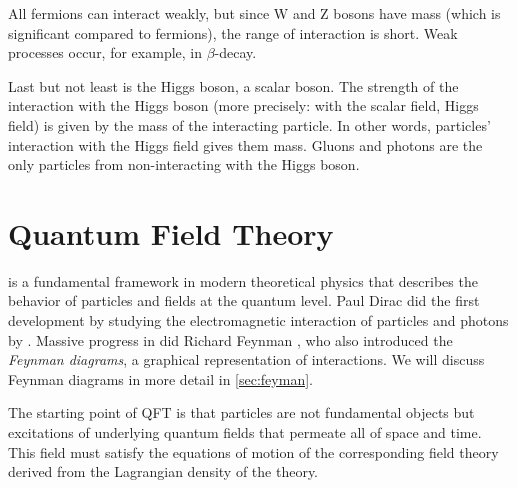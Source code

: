 All fermions can interact weakly, but since W and Z bosons have mass (which is significant compared to fermions), the range of interaction is short.
Weak processes occur, for example, in $\beta$-decay.

Last but not least is the Higgs boson, a scalar boson.
The strength of the interaction with the Higgs boson (more precisely: with the scalar field, Higgs field) is given by the mass of the interacting particle.
In other words, particles' interaction with the Higgs field gives them mass.
Gluons and photons are the only particles from \SM non-interacting with the Higgs boson.



\section{Quantum Field Theory}
\label{sec:qft}
\QFT is a fundamental framework in modern theoretical physics that describes the behavior of particles and fields at the quantum level.
Paul Dirac did the first development by studying the electromagnetic interaction of particles and photons by \cite{dirac}.
Massive progress in \QED did Richard Feynman \cite{feynman}, who also introduced the \emph{Feynman diagrams}, a graphical representation of interactions.
We will discuss Feynman diagrams in more detail in \cref{sec:feyman}.

The starting point of QFT is that particles are not fundamental objects but excitations of underlying quantum fields that permeate all of space and time. 
This field must satisfy the equations of motion of the corresponding field theory derived from the Lagrangian density of the theory.

